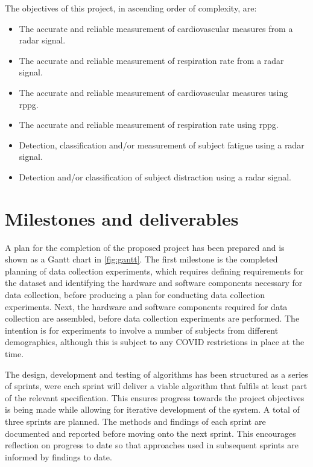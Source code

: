 \documentclass[11pt, parskip=half*,twoside=false]{scrbook}
\begin{document}
{The objectives of this project, in ascending order of complexity, are:
\begin{itemize}
	\item The accurate and reliable measurement of cardiovascular measures from a radar signal.
	\item The accurate and reliable measurement of respiration rate from a radar signal.
	\item The accurate and reliable measurement of cardiovascular measures using \gls{rppg}.
	\item The accurate and reliable measurement of respiration rate using \gls{rppg}.
	\item Detection, classification and/or measurement of subject fatigue using a radar signal.
	\item Detection and/or classification of subject distraction using a radar signal.
\end{itemize}

\section{Milestones and deliverables}

A plan for the completion of the proposed project has been prepared and is shown as a Gantt chart in \cref{fig:gantt}. The first milestone is the completed planning of data collection experiments, which requires defining requirements for the dataset and identifying the hardware and software components necessary for data collection, before producing a plan for conducting data collection experiments. Next, the hardware and software components required for data collection are assembled, before data collection experiments are performed. The intention is for experiments to involve a number of subjects from different demographics, although this is subject to any COVID restrictions in place at the time.  

The design, development and testing of algorithms has been structured as a series of sprints, were each sprint will deliver a viable algorithm that fulfils at least part of the relevant specification. This ensures progress towards the project objectives is being made while allowing for iterative development of the system. A total of three sprints are planned. The methods and findings of each sprint are documented and reported before moving onto the next sprint. This encourages reflection on progress to date so that approaches used in subsequent sprints are informed by findings to date.  

}
\end{document}

